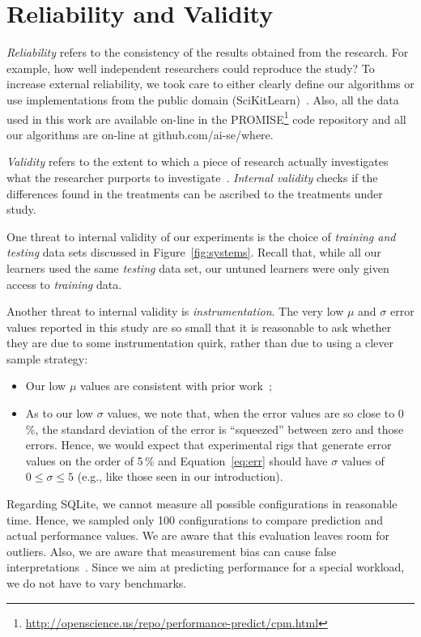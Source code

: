 \documentclass[smallextended]{svjour3}       %
\newcommand{\fig}[1]{Figure~\ref{fig:#1}}
\newcommand{\eq}[1]{Equation~\ref{eq:#1}}
\begin{document}
\section{Reliability and Validity}\label{sect:construct}

{\em Reliability} refers to the consistency of the results obtained
from the research.  For example,   how well independent researchers
could reproduce the study? To increase external
reliability, we took care to either  clearly define our
algorithms or use implementations from the public domain
(SciKitLearn)~\cite{scikit-learn}. Also, all the data used in this work are available
on-line in the PROMISE\footnote{\url{http://openscience.us/repo/performance-predict/cpm.html}} code repository and all our algorithms
are on-line at github.com/ai-se/where.

{\em Validity} refers to the extent to which a piece of research actually
investigates what the researcher purports to investigate~\cite{SSA15}.
{\em Internal validity} checks if the differences found in
the treatments can be ascribed to the treatments under study. 

One threat to internal validity of our experiments is the choice
of {\em training and testing} data sets discussed in 
\fig{systems}. Recall that, while all our learners used the same
{\em testing} data set, our untuned learners were only given
access to {\em training} data.

Another threat to internal validity  is {\em instrumentation}. The very low $\mu$ and $\sigma$ error values
reported in this study are so small that it is reasonable to ask whether they are due to some instrumentation
quirk, rather than due to using a clever sample strategy:
\begin{itemize}
\item
Our low $\mu$ values are consistent with prior work~\cite{sarkar2015cost};
\item
As to our low $\sigma$ values, we note that, when the  error values are so close to 0\,\%, the standard
deviation of the error is ``squeezed'' between zero and those errors. Hence, we would expect that
experimental rigs
that generate error values on the order of 5\,\% and \eq{err} should have $\sigma$ values of $0\le \sigma \le 5$ (e.g., like those seen in our introduction).
\end{itemize}

Regarding SQLite, we cannot measure all possible configurations in reasonable time. Hence, we sampled only 100 configurations to compare prediction and actual performance values. We are aware that this evaluation leaves room for outliers.
Also, we are aware that measurement bias can cause false interpretations~\cite{me12d}. Since we aim at predicting performance for a special workload, we do not have to vary benchmarks.
\end{document}
